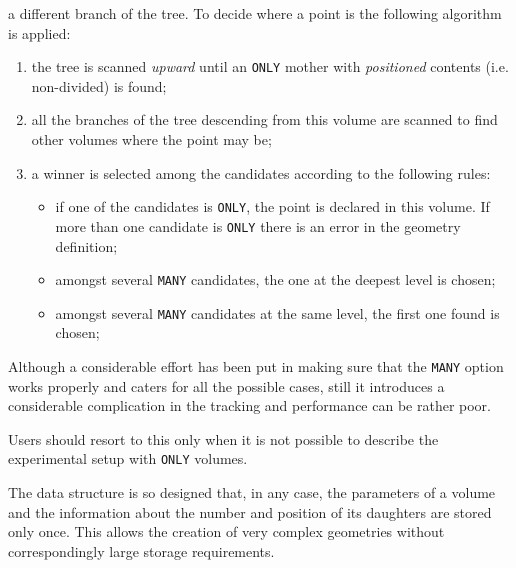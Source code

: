 \begin{itemize}
a different branch of the tree. To decide where a point is the following
algorithm is applied:
\begin{enumerate}
\item the tree is scanned {\it upward} until an {\tt ONLY} mother
with {\it positioned} contents (i.e. non-divided) is found;
\item all the branches of the tree descending from this volume are
scanned to find other volumes where the point may be;
\item a winner is selected among the candidates according to the
following rules:
\begin{itemize}
\item if one of the candidates is {\tt ONLY}, the point is declared in this
volume. If more than one candidate is {\tt ONLY} there is an error in the
geometry definition;
\item amongst several {\tt MANY} candidates, the one at the deepest level
is chosen;
\item amongst several {\tt MANY} candidates at the same level, the first one
found is chosen;
\end{itemize}
\end{enumerate}
Although a considerable effort has been put in making sure that the {\tt MANY}
option works properly and caters for all the possible cases, still it introduces
a considerable complication in the tracking and performance can be
rather poor.

Users should resort to this only when it is not possible to describe the
experimental setup with {\tt ONLY} volumes.
\end{itemize}

The data structure is so designed that, in any case, the parameters
of a volume and the information about the number and position of
its daughters are stored only once. This allows the creation of
very complex geometries without correspondingly large storage
requirements.

